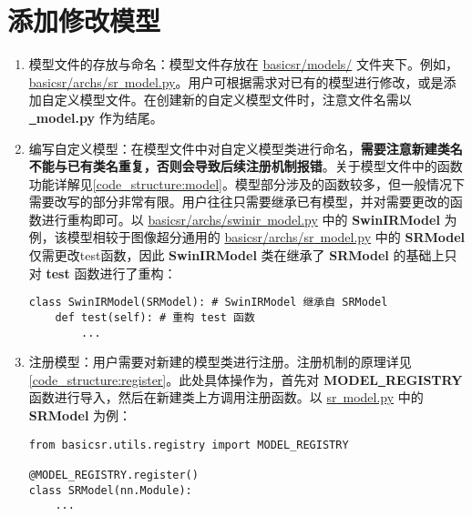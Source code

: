 \documentclass[../main.tex]{subfiles}
\begin{document}
\section{添加修改模型}\label{howto:add_model}

\begin{enumerate}
	\item 模型文件的存放与命名：模型文件存放在 \href{https://github.com/XPixelGroup/BasicSR/tree/master/basicsr/models}{basicsr/models/} 文件夹下。例如，\href{https://github.com/XPixelGroup/BasicSR/tree/master/basicsr/models}{basicsr/archs/sr\underline{~}model.py}。用户可根据需求对已有的模型进行修改，或是添加自定义模型文件。在创建新的自定义模型文件时，注意文件名需以  \textbf{\underline{~}model.py} 作为结尾。
	
	\item 编写自定义模型：在模型文件中对自定义模型类进行命名，\textbf{需要注意新建类名不能与已有类名重复，否则会导致后续注册机制报错}。关于模型文件中的函数功能详解见\ref{code_structure:model}。模型部分涉及的函数较多，但一般情况下需要改写的部分非常有限。用户往往只需要继承已有模型，并对需要更改的函数进行重构即可。以 \href{https://github.com/XPixelGroup/BasicSR/tree/master/basicsr/models}{basicsr/archs/swinir\underline{~}model.py} 中的 \textbf{SwinIRModel} 为例，该模型相较于图像超分通用的 \href{https://github.com/XPixelGroup/BasicSR/tree/master/basicsr/models}{basicsr/archs/sr\underline{~}model.py} 中的 \textbf{SRModel} 仅需更改test函数，因此 \textbf{SwinIRModel} 类在继承了 \textbf{SRModel} 的基础上只对 \textbf{test} 函数进行了重构：
\begin{verbatim}
class SwinIRModel(SRModel): # SwinIRModel 继承自 SRModel
    def test(self): # 重构 test 函数
        ...
\end{verbatim}
	
	\item 注册模型：用户需要对新建的模型类进行注册。注册机制的原理详见\ref{code_structure:register}。此处具体操作为，首先对 \textbf{MODEL\underline{~}REGISTRY} 函数进行导入，然后在新建类上方调用注册函数。以 \href{https://github.com/XPixelGroup/BasicSR/tree/master/basicsr/models/sr_model.py}{sr\underline{~}model.py} 中的 \textbf{SRModel} 为例：
\begin{verbatim}
from basicsr.utils.registry import MODEL_REGISTRY
	
@MODEL_REGISTRY.register()
class SRModel(nn.Module):
    ...
\end{verbatim}
	

\end{enumerate}
\end{document}
